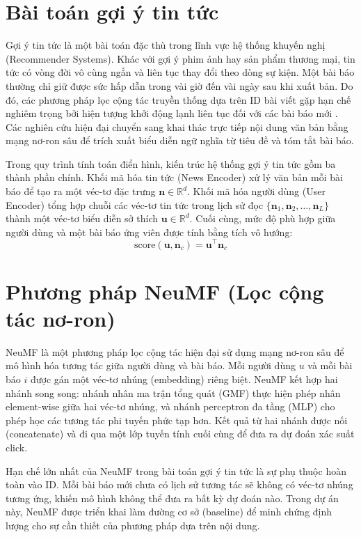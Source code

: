 \documentclass[../BTL.tex]{subfiles}
\begin{document}
\section{Bài toán gợi ý tin tức}

Gợi ý tin tức là một bài toán đặc thù trong lĩnh vực hệ thống khuyến nghị (Recommender Systems). Khác với gợi ý phim ảnh hay sản phẩm thương mại, tin tức có vòng đời vô cùng ngắn và liên tục thay đổi theo dòng sự kiện. Một bài báo thường chỉ giữ được sức hấp dẫn trong vài giờ đến vài ngày sau khi xuất bản. Do đó, các phương pháp lọc cộng tác truyền thống dựa trên ID bài viết gặp hạn chế nghiêm trọng bởi hiện tượng khởi động lạnh liên tục đối với các bài báo mới \cite{wu2020mind}. Các nghiên cứu hiện đại chuyển sang khai thác trực tiếp nội dung văn bản bằng mạng nơ-ron sâu để trích xuất biểu diễn ngữ nghĩa từ tiêu đề và tóm tắt bài báo.

Trong quy trình tính toán điển hình, kiến trúc hệ thống gợi ý tin tức gồm ba thành phần chính. Khối mã hóa tin tức (News Encoder) xử lý văn bản mỗi bài báo để tạo ra một véc-tơ đặc trưng $\mathbf{n} \in \mathbb{R}^{d}$. Khối mã hóa người dùng (User Encoder) tổng hợp chuỗi các véc-tơ tin tức trong lịch sử đọc $\{\mathbf{n}_1, \mathbf{n}_2, \ldots, \mathbf{n}_L\}$ thành một véc-tơ biểu diễn sở thích $\mathbf{u} \in \mathbb{R}^{d}$. Cuối cùng, mức độ phù hợp giữa người dùng và một bài báo ứng viên được tính bằng tích vô hướng:
\begin{equation}
    \text{score}(\mathbf{u}, \mathbf{n}_c) = \mathbf{u}^{\top} \mathbf{n}_c
\end{equation}

\section{Phương pháp NeuMF (Lọc cộng tác nơ-ron)}

NeuMF \cite{he2017neumf} là một phương pháp lọc cộng tác hiện đại sử dụng mạng nơ-ron sâu để mô hình hóa tương tác giữa người dùng và bài báo. Mỗi người dùng $u$ và mỗi bài báo $i$ được gán một véc-tơ nhúng (embedding) riêng biệt. NeuMF kết hợp hai nhánh song song: nhánh nhân ma trận tổng quát (GMF) thực hiện phép nhân element-wise giữa hai véc-tơ nhúng, và nhánh perceptron đa tầng (MLP) cho phép học các tương tác phi tuyến phức tạp hơn. Kết quả từ hai nhánh được nối (concatenate) và đi qua một lớp tuyến tính cuối cùng để đưa ra dự đoán xác suất click.

Hạn chế lớn nhất của NeuMF trong bài toán gợi ý tin tức là sự phụ thuộc hoàn toàn vào ID. Mỗi bài báo mới chưa có lịch sử tương tác sẽ không có véc-tơ nhúng tương ứng, khiến mô hình không thể đưa ra bất kỳ dự đoán nào. Trong dự án này, NeuMF được triển khai làm đường cơ sở (baseline) để minh chứng định lượng cho sự cần thiết của phương pháp dựa trên nội dung.
\end{document}
